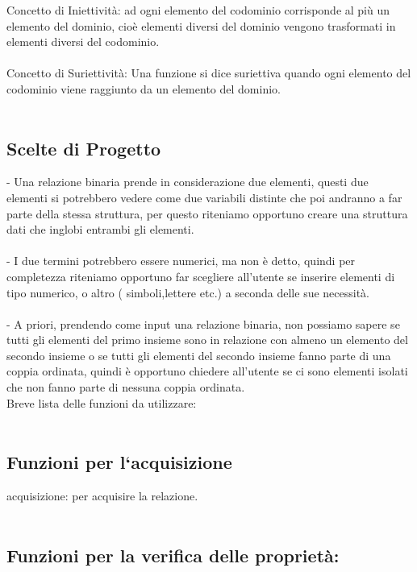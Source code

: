 \documentclass[11pt, a4paper, titlepage, block]{article}
\begin{document}
Concetto di Iniettivit\`a: ad ogni elemento del codominio corrisponde al pi\`u
un elemento del dominio, cio\`e elementi diversi del dominio
vengono trasformati in elementi diversi del codominio.\\
\\
Concetto di Suriettivit\`a: Una funzione si dice suriettiva quando ogni elemento del codominio viene raggiunto da un elemento del dominio.\\
\\
\newpage
\subsection{Scelte di Progetto}

- Una relazione binaria prende in considerazione due elementi, questi due elementi si potrebbero vedere come due variabili distinte che poi andranno a far parte della stessa struttura, per questo riteniamo opportuno creare una struttura dati che inglobi entrambi gli elementi.\\
\\
- I due termini potrebbero essere numerici, ma non \`e detto, quindi per completezza riteniamo opportuno far scegliere all'utente se inserire elementi di tipo numerico, o altro  ( simboli,lettere etc.)  a seconda delle sue necessit\`a.\\
\\
- A priori, prendendo come input una relazione binaria, non possiamo sapere se tutti gli elementi del primo insieme sono in relazione con almeno un elemento del secondo insieme o se tutti gli elementi del secondo insieme fanno parte di una coppia ordinata, quindi \`e opportuno chiedere all'utente se ci sono elementi isolati che non fanno parte di nessuna coppia ordinata.\\  
\newpage
Breve lista delle funzioni da utilizzare:\\
\\
	\subsection{Funzioni per l`acquisizione}
	
	acquisizione:  per acquisire la relazione.\\
	\\
	
	\subsection{Funzioni per la verifica delle propriet\`a:}
\end{document}
